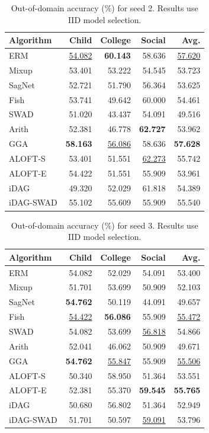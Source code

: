 \documentclass[10pt]{article}
\begin{document}
\begin{table}[H]
  \centering
  \caption{Out-of-domain accuracy (\%) for seed 2. Results use IID model selection.}
  \label{tab:seed-2}
  \begin{tabular}{lrrrr}
    \toprule
    Algorithm & Child & College & Social & Avg. \\
    \midrule
    ERM & \underline{54.082} & \textbf{60.143} & 58.636 & \underline{57.620} \\
    Mixup & 53.401 & 53.222 & 54.545 & 53.723 \\
    SagNet & 52.721 & 51.790 & 56.364 & 53.625 \\
    Fish & 53.741 & 49.642 & 60.000 & 54.461 \\
    SWAD & 51.020 & 43.437 & 54.091 & 49.516 \\
    Arith & 52.381 & 46.778 & \textbf{62.727} & 53.962 \\
    GGA & \textbf{58.163} & \underline{56.086} & 58.636 & \textbf{57.628} \\
    ALOFT-S & 53.401 & 51.551 & \underline{62.273} & 55.742 \\
    ALOFT-E & 54.422 & 51.551 & 55.909 & 53.961 \\
    iDAG & 49.320 & 52.029 & 61.818 & 54.389 \\
    iDAG-SWAD & 55.102 & 55.609 & 55.909 & 55.540 \\
    \bottomrule
  \end{tabular}
\end{table}
\begin{table}[H]
  \centering
  \caption{Out-of-domain accuracy (\%) for seed 3. Results use IID model selection.}
  \label{tab:seed-3}
  \begin{tabular}{lrrrr}
    \toprule
    Algorithm & Child & College & Social & Avg. \\
    \midrule
    ERM & 54.082 & 52.029 & 54.091 & 53.400 \\
    Mixup & 51.701 & 53.699 & 50.909 & 52.103 \\
    SagNet & \textbf{54.762} & 50.119 & 44.091 & 49.657 \\
    Fish & \underline{54.422} & \textbf{56.086} & 55.909 & \underline{55.472} \\
    SWAD & 54.082 & 53.699 & \underline{56.818} & 54.866 \\
    Arith & 52.041 & 46.062 & 50.909 & 49.671 \\
    GGA & \textbf{54.762} & \underline{55.847} & 55.909 & \underline{55.506} \\
    ALOFT-S & 50.340 & 58.950 & 51.364 & 53.551 \\
    ALOFT-E & 52.381 & 55.370 & \textbf{59.545} & \textbf{55.765} \\
    iDAG & 50.680 & 56.802 & 51.364 & 52.949 \\
    iDAG-SWAD & 51.701 & 50.597 & \underline{59.091} & 53.796 \\
    \bottomrule
  \end{tabular}
\end{table}
\end{document}

